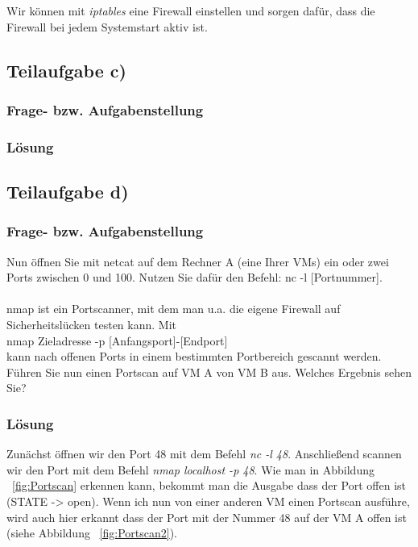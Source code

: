 Wir können mit \textit{iptables} eine Firewall einstellen und sorgen dafür, dass die Firewall bei jedem Systemstart aktiv ist.

\subsection{Teilaufgabe c)}

\subsubsection{Frage- bzw. Aufgabenstellung}


\subsubsection{Lösung}


\subsection{Teilaufgabe d)}

\subsubsection{Frage- bzw. Aufgabenstellung}

Nun öffnen Sie mit netcat auf dem Rechner A (eine Ihrer VMs) ein oder zwei Ports zwischen 0 und 100. Nutzen Sie dafür den Befehl: nc -l [Portnummer].\\
\\
nmap ist ein Portscanner, mit dem man u.a. die eigene Firewall auf Sicherheitslücken testen kann. Mit \\
nmap Zieladresse -p [Anfangsport]-[Endport] \\
kann nach offenen Ports in einem bestimmten Portbereich gescannt werden. Führen Sie nun einen Portscan auf VM A von VM B aus. Welches Ergebnis sehen Sie?

\subsubsection{Lösung}

Zunächst öffnen wir den Port 48 mit dem Befehl \textit{nc -l 48}. Anschließend scannen wir den Port mit dem Befehl \textit{nmap localhost -p 48}. Wie man in Abbildung ~\ref{fig:Portscan} erkennen kann, bekommt man die Ausgabe dass der Port offen ist (STATE -> open). Wenn ich nun von einer anderen VM einen Portscan ausführe, wird auch hier erkannt dass der Port mit der Nummer 48 auf der VM A offen ist (siehe Abbildung ~\ref{fig:Portscan2}). 

